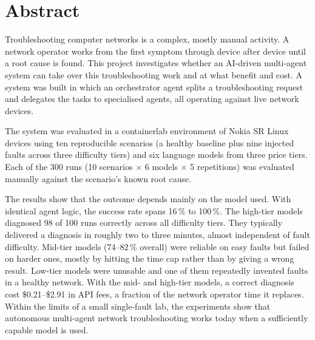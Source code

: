 \section*{Abstract}

Troubleshooting computer networks is a complex, mostly manual activity. A network operator
works from the first symptom through device after device until a root cause is found. This
project investigates whether an AI-driven multi-agent system can take over this troubleshooting work
and at what benefit and cost. A system was built in which an orchestrator agent splits a
troubleshooting request and delegates the tasks to specialised agents, all operating against live network devices.

The system was evaluated in a containerlab environment of Nokia SR Linux devices using ten reproducible 
scenarios (a healthy baseline plus nine injected faults across three
difficulty tiers) and six language models from three price tiers. Each of the 300 runs
(10 scenarios $\times$ 6 models $\times$ 5 repetitions) was evaluated manually against the
scenario's known root cause.

The results show that the outcome depends mainly on the model used. With identical
agent logic, the success rate spans 16\,\% to 100\,\%. The high-tier models diagnosed 98 of 100
runs correctly across all difficulty tiers. They typically delivered a diagnosis in roughly
two to three minutes, almost independent of fault difficulty. Mid-tier models (74--82\,\%
overall) were reliable on easy faults but failed on harder ones, mostly
by hitting the time cap rather than by giving a wrong result. Low-tier models were
unusable and one of them repeatedly invented faults in a healthy network. With the mid- and high-tier
models, a correct diagnosis cost \$0.21--\$2.91 in API fees, a fraction of the
network operator time it replaces. Within the limits of a small single-fault lab, the experiments
show that autonomous multi-agent network troubleshooting works today when a sufficiently capable
model is used.

\vspace{2ex}
